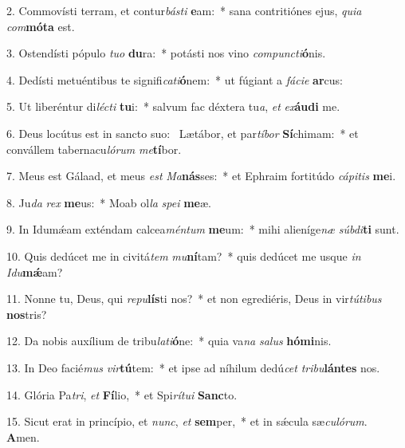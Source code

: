 2. Commovísti terram, et contur\textit{bás}\textit{ti} \textbf{e}am:~*  sana contritiónes ejus, \textit{qui}\textit{a} \textit{com}\textbf{mó}\textbf{ta} est.\

3. Ostendísti pópulo \textit{tu}\textit{o} \textbf{du}ra:~*  potásti nos vino \textit{com}\textit{punc}\textit{ti}\textbf{ó}nis.\

4. Dedísti metuéntibus te signifi\textit{ca}\textit{ti}\textbf{ó}nem:~*  ut fúgiant a \textit{fá}\textit{ci}\textit{e} \textbf{ar}cus:\

5. Ut liberéntur di\textit{léc}\textit{ti} \textbf{tu}i:~*  salvum fac déxtera tu\textit{a}, \textit{et} \textit{ex}\textbf{áu}\textbf{di} me.\

6. Deus locútus est in sancto suo: \dag\  Lætábor, et par\textit{tí}\textit{bor} \textbf{Sí}chimam:~*  et convállem tabernacu\textit{ló}\textit{rum} \textit{me}\textbf{tí}bor.\

7. Meus est Gálaad, et meus \textit{est} \textit{Ma}\textbf{nás}ses:~*  et Ephraim fortitúdo \textit{cá}\textit{pi}\textit{tis} \textbf{me}i.\

8. Ju\textit{da} \textit{rex} \textbf{me}us:~*  Moab ol\textit{la} \textit{spe}\textit{i} \textbf{me}æ.\

9. In Idumǽam exténdam calcea\textit{mén}\textit{tum} \textbf{me}um:~*  mihi alieníge\textit{næ} \textit{súb}\textit{di}\textbf{ti} sunt.\

10. Quis dedúcet me in civitá\textit{tem} \textit{mu}\textbf{ní}tam?~*  quis dedúcet me usque \textit{in} \textit{I}\textit{du}\textbf{mǽ}am?\

11. Nonne tu, Deus, qui \textit{re}\textit{pu}\textbf{lís}ti nos?~*  et non egrediéris, Deus in vir\textit{tú}\textit{ti}\textit{bus} \textbf{nos}tris?\

12. Da nobis auxílium de tribu\textit{la}\textit{ti}\textbf{ó}ne:~*  quia va\textit{na} \textit{sa}\textit{lus} \textbf{hó}\textbf{mi}nis.\

13. In Deo facié\textit{mus} \textit{vir}\textbf{tú}tem:~*  et ipse ad níhilum dedú\textit{cet} \textit{tri}\textit{bu}\textbf{lán}\textbf{tes} nos.\

14. Glória Pa\textit{tri}, \textit{et} \textbf{Fí}lio,~*  et Spi\textit{rí}\textit{tu}\textit{i} \textbf{Sanc}to.\

15. Sicut erat in princípio, et \textit{nunc}, \textit{et} \textbf{sem}per,~*  et in sǽcula sæ\textit{cu}\textit{ló}\textit{rum}. \textbf{A}men.\


